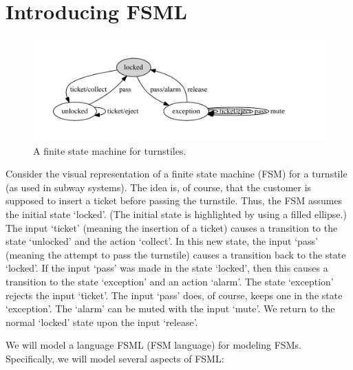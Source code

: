 \documentclass[preprint,authoryear,12pt]{noelsarticle}
\begin{document}
\tableofcontents

\pagebreak


\section{Introducing FSML}


\begin{figure}[t!]
\vspace{-77\in}
\includegraphics[width=\textwidth]{../../languages/fsml/dot/sample.pdf}
\vspace{-150\in}
\caption{A finite state machine for turnstiles.}
\label{F:turnstile}
\end{figure}


Consider the visual representation of a finite state machine (FSM) for
a turnstile (as used in subway systems). The idea is, of course, that
the customer is supposed to insert a ticket before passing the
turnstile. Thus, the FSM assumes the initial state `locked'. (The
initial state is highlighted by using a filled ellipse.) The input
`ticket' (meaning the insertion of a ticket) causes a transition to
the state `unlocked' and the action `collect'. In this new state, the
input `pass' (meaning the attempt to pass the turnstile) causes a
transition back to the state `locked'. If the input `pass' was made in
the state `locked', then this causes a transition to the state
`exception' and an action `alarm'. The state `exception' rejects the
input `ticket'. The input `pass' does, of course, keeps one in the
state `exception'. The `alarm' can be muted with the input `mute'. We
return to the normal `locked' state upon the input `release'.

We will model a language FSML (FSM language) for modeling
FSMs. Specifically, we will model several aspects of FSML:
\end{document}
